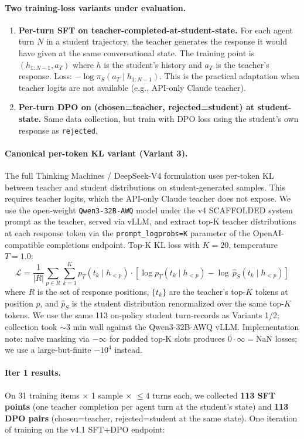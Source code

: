 \documentclass[11pt]{article}
\begin{document}
\paragraph{Two training-loss variants under evaluation.}
\begin{enumerate}[leftmargin=2em,nosep]
\item \textbf{Per-turn SFT on teacher-completed-at-student-state.} For each agent turn $N$ in a student trajectory, the teacher generates the response it would have given at the same conversational state. The training point is $(h_{1:N-1}, a_T)$ where $h$ is the student's history and $a_T$ is the teacher's response. Loss: $-\log \pi_S(a_T \mid h_{1:N-1})$. This is the practical adaptation when teacher logits are not available (e.g., API-only Claude teacher).
\item \textbf{Per-turn DPO on (chosen=teacher, rejected=student) at student-state.} Same data collection, but train with DPO loss using the student's own response as \texttt{rejected}.
\end{enumerate}

\paragraph{Canonical per-token KL variant (Variant 3).} The full Thinking Machines / DeepSeek-V4 formulation uses per-token KL between teacher and student distributions on student-generated samples. This requires teacher logits, which the API-only Claude teacher does not expose. We use the open-weight \texttt{Qwen3-32B-AWQ} model under the v4 SCAFFOLDED system prompt as the teacher, served via vLLM, and extract top-K teacher distributions at each response token via the \texttt{prompt\_logprobs=K} parameter of the OpenAI-compatible completions endpoint. Top-K KL loss with $K=20$, temperature $T=1.0$:
\[
\mathcal{L} = \frac{1}{|R|} \sum_{p \in R} \sum_{k=1}^{K} p_T(t_k \mid h_{<p}) \cdot \left[ \log p_T(t_k \mid h_{<p}) - \log\, \hat p_S(t_k \mid h_{<p}) \right]
\]
where $R$ is the set of response positions, $\{t_k\}$ are the teacher's top-$K$ tokens at position $p$, and $\hat p_S$ is the student distribution renormalized over the same top-$K$ tokens. We use the same 113 on-policy student turn-records as Variants 1/2; collection took $\sim$3 min wall against the Qwen3-32B-AWQ vLLM. Implementation note: na\"ive masking via $-\infty$ for padded top-K slots produces $0\!\cdot\!\infty\!=\!\text{NaN}$ losses; we use a large-but-finite $-10^4$ instead.

\paragraph{Iter 1 results.} On 31 training items × 1 sample × $\leq 4$ turns each, we collected \textbf{113 SFT points} (one teacher completion per agent turn at the student's state) and \textbf{113 DPO pairs} (chosen=teacher, rejected=student at the same state). One iteration of training on the v4.1 SFT$+$DPO endpoint:
\end{document}
